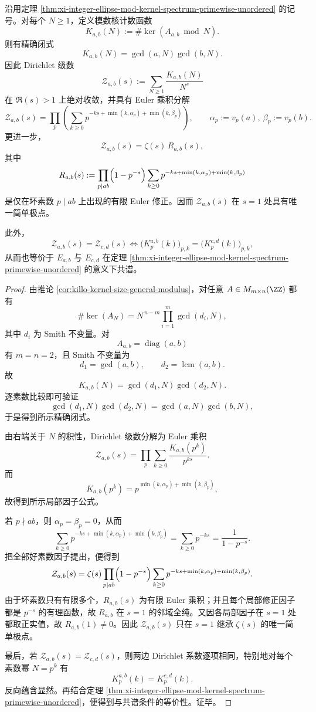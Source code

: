 \begin{corollary}\label{cor:xi-integer-ellipse-mod-kernel-dirichlet-zeta}
沿用定理 \ref{thm:xi-integer-ellipse-mod-kernel-spectrum-primewise-unordered} 的记号。对每个 \(N\ge 1\)，定义模数核计数函数
\[
K_{a,b}(N):=\#\ker(A_{a,b}\bmod N).
\]
则有精确闭式
\[
K_{a,b}(N)=\gcd(a,N)\gcd(b,N).
\]
因此 Dirichlet 级数
\[
\mathcal Z_{a,b}(s):=\sum_{N\ge 1}\frac{K_{a,b}(N)}{N^s}
\]
在 \(\Re(s)>1\) 上绝对收敛，并具有 Euler 乘积分解
\[
\mathcal Z_{a,b}(s)
=
\prod_p
\left(
\sum_{k\ge 0}p^{-ks+\min(k,\alpha_p)+\min(k,\beta_p)}
\right),
\qquad
\alpha_p:=v_p(a),\ \beta_p:=v_p(b).
\]
更进一步，
\[
\mathcal Z_{a,b}(s)=\zeta(s)\,R_{a,b}(s),
\]
其中
\[
R_{a,b}(s):=
\prod_{p\mid ab}
\Bigl(1-p^{-s}\Bigr)
\sum_{k\ge 0}p^{-ks+\min(k,\alpha_p)+\min(k,\beta_p)}
\]
是仅在坏素数 \(p\mid ab\) 上出现的有限 Euler 修正。因而 \(\mathcal Z_{a,b}(s)\) 在 \(s=1\) 处具有唯一简单极点。

此外，
\[
\mathcal Z_{a,b}(s)=\mathcal Z_{c,d}(s)
\iff
\bigl(K_p^{a,b}(k)\bigr)_{p,k}=\bigl(K_p^{c,d}(k)\bigr)_{p,k},
\]
从而也等价于 \(E_{a,b}\) 与 \(E_{c,d}\) 在定理 \ref{thm:xi-integer-ellipse-mod-kernel-spectrum-primewise-unordered} 的意义下共谱。
\end{corollary}
\begin{proof}
由推论 \ref{cor:killo-kernel-size-general-modulus}，对任意 \(A\in M_{m\times n}(\ZZ)\) 都有
\[
\#\ker(A_N)=N^{\,n-m}\prod_{i=1}^{m}\gcd(d_i,N),
\]
其中 \(d_i\) 为 Smith 不变量。对
\[
A_{a,b}=\operatorname{diag}(a,b)
\]
有 \(m=n=2\)，且 Smith 不变量为
\[
d_1=\gcd(a,b),
\qquad
d_2=\operatorname{lcm}(a,b).
\]
故
\[
K_{a,b}(N)=\gcd(d_1,N)\gcd(d_2,N).
\]
逐素数比较即可验证
\[
\gcd(d_1,N)\gcd(d_2,N)=\gcd(a,N)\gcd(b,N),
\]
于是得到所示精确闭式。

由右端关于 \(N\) 的积性，Dirichlet 级数分解为 Euler 乘积
\[
\mathcal Z_{a,b}(s)
=
\prod_p \sum_{k\ge 0}\frac{K_{a,b}(p^k)}{p^{ks}}.
\]
而
\[
K_{a,b}(p^k)=p^{\min(k,\alpha_p)+\min(k,\beta_p)},
\]
故得到所示局部因子公式。

若 \(p\nmid ab\)，则 \(\alpha_p=\beta_p=0\)，从而
\[
\sum_{k\ge 0}p^{-ks+\min(k,\alpha_p)+\min(k,\beta_p)}
=
\sum_{k\ge 0}p^{-ks}
=
\frac{1}{1-p^{-s}}.
\]
把全部好素数因子提出，便得到
\[
\mathcal Z_{a,b}(s)
=
\zeta(s)
\prod_{p\mid ab}
\Bigl(1-p^{-s}\Bigr)
\sum_{k\ge 0}p^{-ks+\min(k,\alpha_p)+\min(k,\beta_p)}.
\]
由于坏素数只有有限多个，\(R_{a,b}(s)\) 为有限 Euler 乘积；并且每个局部修正因子都是 \(p^{-s}\) 的有理函数，故 \(R_{a,b}\) 在 \(s=1\) 的邻域全纯。又因各局部因子在 \(s=1\) 处都取正实值，故 \(R_{a,b}(1)\neq 0\)。因此 \(\mathcal Z_{a,b}(s)\) 只在 \(s=1\) 继承 \(\zeta(s)\) 的唯一简单极点。

最后，若 \(\mathcal Z_{a,b}(s)=\mathcal Z_{c,d}(s)\)，则两边 Dirichlet 系数逐项相同，特别地对每个素数幂 \(N=p^k\) 有
\[
K_p^{a,b}(k)=K_p^{c,d}(k).
\]
反向蕴含显然。再结合定理 \ref{thm:xi-integer-ellipse-mod-kernel-spectrum-primewise-unordered}，便得到与共谱条件的等价性。证毕。
\end{proof}

